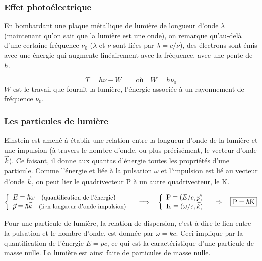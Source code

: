 \documentclass[12pt, a4paper]{book}
\begin{document}
\subsubsection{Effet photoélectrique}
En bombardant une plaque métallique de lumière de longueur d'onde $\lambda$ (maintenant qu'on sait que la lumière est une onde), on remarque qu'au-delà d'une certaine fréquence $\nu_0$ ($\lambda$ et $\nu$ sont liées par $\lambda = c/\nu$), des électrons sont émis avec une énergie qui augmente linéairement avec la fréquence, avec une pente de $h$.

$$ T = h\nu - W \qquad \text{où} \quad W = h\nu_0 $$
$W$ est le travail que fournit la lumière, l'énergie associée à un rayonnement de fréquence $\nu_0$.

\subsubsection{Les particules de lumière}
Einstein est amené à établir une relation entre la longueur d'onde de la lumière et une impulsion (à travers le nombre d'onde, ou plus précisément, le vecteur d'onde $\vec{k}$). Ce faisant, il donne aux quantas d'énergie toutes les propriétés d'une particule. Comme l'énergie et liée à la pulsation $\omega$ et l'impulsion est lié au vecteur d'onde $\vec{k}$, on peut lier le quadrivecteur $\mathrm{P}$ à un autre quadrivecteur, le  $\mathrm{K}$.
\begin{center}
$\left\{ \begin{array}{l}
E \equiv \hbar \omega \quad \text{\small (quantification de l'énergie}) \\
\vec{p} \equiv \hbar \vec{k}  \quad \text{\small (lien longueur d'onde-impulsion)}
\end{array} \right.
\quad \Longrightarrow \quad 
\left\{ \begin{array}{l}
\mathrm{P} \equiv (E/c, \vec{p}) \\
\mathrm{K} \equiv (\omega/c, \vec{k})
\end{array} \right. \quad \Rightarrow \quad \boxed{\mathrm{P} = \hbar \mathrm{K}}$
\end{center}
Pour une particule de lumière, la relation de dispersion, c'est-à-dire le lien entre la pulsation et le nombre d'onde, est donnée par  $\omega = kc$. Ceci implique par la quantification de l'énergie $E = pc$, ce qui est la caractéristique d'une particule de masse nulle. La lumière est ainsi faite de particules de masse nulle. \\
\end{document}
